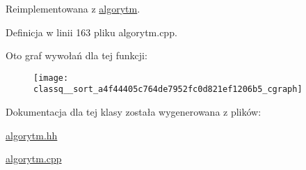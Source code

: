 \-Reimplementowana z \hyperlink{classalgorytm_af3f92bf537b1f2e1f93173983e838449}{algorytm}.



\-Definicja w linii 163 pliku algorytm.\-cpp.



\-Oto graf wywołań dla tej funkcji\-:
\nopagebreak
\begin{figure}[H]
\begin{center}
\leavevmode
\texttt{[image: classq\_\_sort\_a4f44405c764de7952fc0d821ef1206b5\_cgraph]}
\end{center}
\end{figure}




\-Dokumentacja dla tej klasy została wygenerowana z plików\-:\begin{DoxyCompactItemize}
\item 
\hyperlink{algorytm_8hh}{algorytm.\-hh}\item 
\hyperlink{algorytm_8cpp}{algorytm.\-cpp}\end{DoxyCompactItemize}
